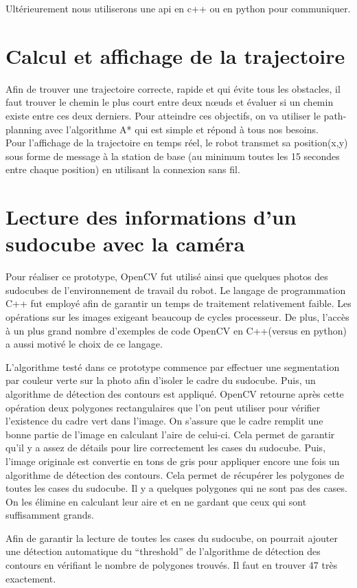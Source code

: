 Ultérieurement nous utiliserons une api en c++ ou en python pour communiquer.

\section{Calcul et affichage de la trajectoire}\label{s:traj}
Afin de trouver une trajectoire correcte, rapide et qui évite tous les obstacles, il faut trouver le chemin le plus court entre deux nœuds et évaluer si un chemin existe entre ces deux derniers.  Pour atteindre ces objectifs, on va utiliser le path-planning  avec l’algorithme A* qui est simple et répond à tous nos besoins.\\
Pour l’affichage de la trajectoire en temps réel, le robot transmet sa position(x,y) sous forme de message à la station de base (au minimum toutes les  15 secondes entre chaque position) en utilisant la connexion sans fil.

\section{Lecture des informations d'un sudocube avec la caméra}
Pour réaliser ce prototype, OpenCV fut utilisé ainsi que quelques photos des sudocubes de l’environnement de travail du robot. Le langage de programmation C++ fut employé afin de garantir un temps de traitement relativement faible. Les opérations sur les images exigeant beaucoup de cycles processeur. De plus, l'accès à un plus grand nombre d'exemples de code OpenCV en C++(versus en python) a aussi motivé le choix de ce langage.

L'algorithme testé dans ce prototype commence par effectuer une segmentation par couleur verte sur la photo afin d'isoler le cadre du sudocube. Puis, un algorithme de détection des contours est appliqué. OpenCV retourne après cette opération deux polygones rectangulaires que l'on peut utiliser pour vérifier l'existence du cadre vert dans l'image. On s'assure que le cadre remplit une bonne partie de l'image en calculant l'aire de celui-ci. Cela permet de garantir qu'il y a assez de détails pour lire correctement les cases du sudocube. Puis, l'image originale est convertie en tons de gris pour appliquer encore une fois un algorithme de détection des contours. Cela permet de récupérer les polygones de toutes les cases du sudocube. Il y a quelques polygones qui ne sont pas des cases. On les élimine en calculant leur aire et en ne gardant que ceux qui sont suffisamment grands.

Afin de garantir la lecture de toutes les cases du sudocube, on pourrait ajouter une détection automatique du “threshold” de l'algorithme de détection des contours en vérifiant le nombre de polygones trouvés. Il faut en trouver 47 très exactement.

